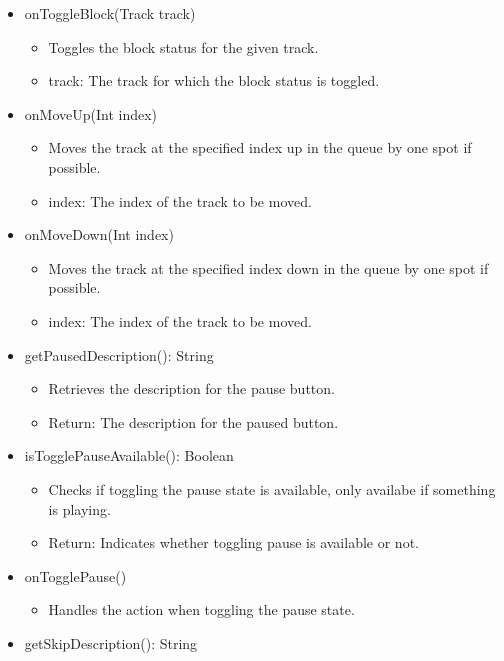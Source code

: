 \documentclass[oneside, ngerman]{sdqtechreport}
\begin{document}
\begin{itemize}
    \item onToggleBlock(Track track)
        \begin{itemize}
            \item Toggles the block status for the given track.
            \item track: The track for which the block status is toggled.
        \end{itemize}
    \item onMoveUp(Int index)
        \begin{itemize}
            \item Moves the track at the specified index up in the queue by one spot if possible.
            \item index: The index of the track to be moved.
        \end{itemize}
    \item onMoveDown(Int index)
        \begin{itemize}
            \item Moves the track at the specified index down in the queue by one spot if possible.
            \item index: The index of the track to be moved.
        \end{itemize}
    \item getPausedDescription(): String
        \begin{itemize}
            \item Retrieves the description for the pause button.
            \item Return: The description for the paused button.
        \end{itemize}
    \item isTogglePauseAvailable(): Boolean
        \begin{itemize}
            \item Checks if toggling the pause state is available, only availabe if something is playing.
            \item Return: Indicates whether toggling pause is available or not.
        \end{itemize}
    \item onTogglePause()
        \begin{itemize}
            \item Handles the action when toggling the pause state.
        \end{itemize}
    \item getSkipDescription(): String
        \begin{itemize}

\end{itemize}
\end{itemize}
\end{document}
